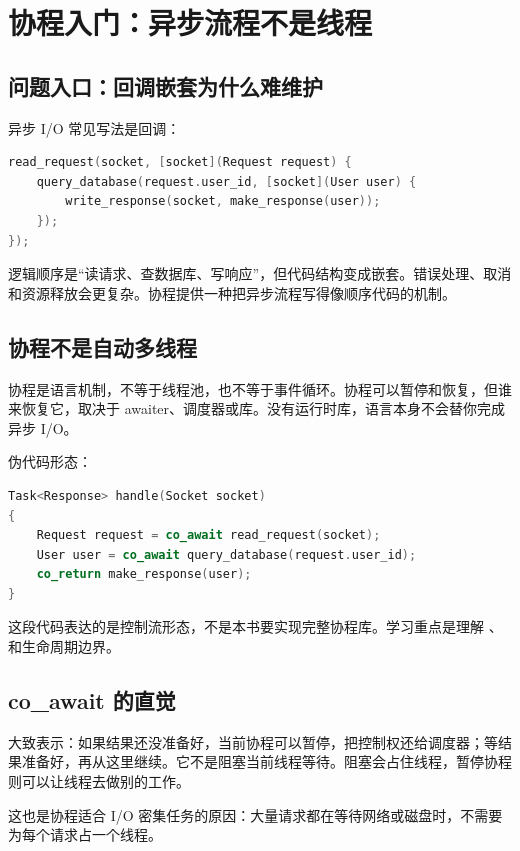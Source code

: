 \chapter{协程入门：异步流程不是线程}

\section{问题入口：回调嵌套为什么难维护}

异步 I/O 常见写法是回调：

\begin{lstlisting}[language=C++,caption={回调嵌套示意}]
read_request(socket, [socket](Request request) {
    query_database(request.user_id, [socket](User user) {
        write_response(socket, make_response(user));
    });
});
\end{lstlisting}

逻辑顺序是“读请求、查数据库、写响应”，但代码结构变成嵌套。错误处理、取消和资源释放会更复杂。协程提供一种把异步流程写得像顺序代码的机制。

\section{协程不是自动多线程}

 协程是语言机制，不等于线程池，也不等于事件循环。协程可以暂停和恢复，但谁来恢复它，取决于 awaiter、调度器或库。没有运行时库，语言本身不会替你完成异步 I/O。

伪代码形态：

\begin{lstlisting}[language=C++,caption={协程式异步流程示意}]
Task<Response> handle(Socket socket)
{
    Request request = co_await read_request(socket);
    User user = co_await query_database(request.user_id);
    co_return make_response(user);
}
\end{lstlisting}

这段代码表达的是控制流形态，不是本书要实现完整协程库。学习重点是理解 、 和生命周期边界。

\section{co\_await 的直觉}

 大致表示：如果结果还没准备好，当前协程可以暂停，把控制权还给调度器；等结果准备好，再从这里继续。它不是阻塞当前线程等待。阻塞会占住线程，暂停协程则可以让线程去做别的工作。

这也是协程适合 I/O 密集任务的原因：大量请求都在等待网络或磁盘时，不需要为每个请求占一个线程。

